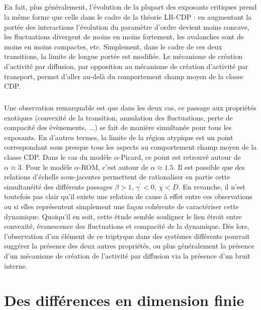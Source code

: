 \subparagraph{}En fait, plus généralement, l'évolution de la plupart des exposants critiques prend la même forme que celle dans le cadre de la théorie LR-CDP : en augmentant la portée des interactions l'évolution du paramètre d'ordre devient moins concave, les fluctuations divergent de moins en moins fortement, les avalanches sont de moins en moins compactes, etc. Simplement, dans le cadre de ces deux transitions, la limite de longue portée est modifiée. Le mécanisme de création d'activité par diffusion, par opposition au mécanisme de création d'activité par transport, permet d'aller au-delà du comportement champ moyen de la classe CDP.

\subparagraph{}Une observation remarquable est que dans les deux cas, ce passage aux propriétés exotiques (convexité de la transition, annulation des fluctuations, perte de compacité des évènements, ...) se fait de manière simultanée pour tous les exposants. En d'autres termes, la limite de la région atypique est un point correspondant sous presque tous les aspects au comportement champ moyen de la classe CDP. Dans le cas du modèle $\alpha$-Picard, ce point est retrouvé autour de $\alpha \approx 3$. Pour le modèle $\alpha$-ROM, c'est autour de $\alpha \approx 1.5$. Il est possible que des relations d'échelle sous-jacentes permettent de rationaliser en partie cette simultanéité des différents passages $\beta > 1$, $\gamma^\prime < 0$, $\chi < D$. En revanche, il n'est toutefois pas clair qu'il existe une relation de cause à effet entre ces observations ou si elles représentent simplement une façon cohérente de caractériser cette dynamique. Quoiqu'il en soit, cette étude semble souligner le lien étroit entre convexité, évanescence des fluctuations et compacité de la dynamique. Dès lors, l'observation d'un élément de ce triptyque dans des systèmes différents pourrait suggérer la présence des deux autres propriétés, ou plus généralement la présence d'un mécanisme de création de l'activité par diffusion via la présence d'un bruit interne.

\newpage

\section{Des différences en dimension finie}

